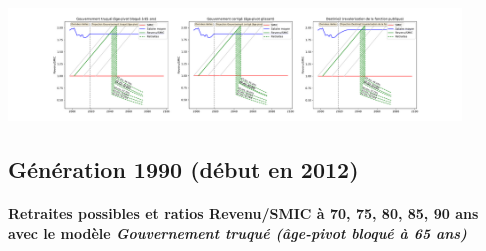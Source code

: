  \begin{center}\includegraphics[width=0.9\textwidth]{fig/Ascendant12_1980_22_dest_retraite.pdf}\end{center} \label{fig/Ascendant12_1980_22_dest_retraite.pdf} 

\newpage 
 
\subsection{Génération 1990 (début en 2012)} 

\paragraph{Retraites possibles et ratios Revenu/SMIC à 70, 75, 80, 85, 90 ans avec le modèle \emph{Gouvernement truqué (âge-pivot bloqué à 65 ans)}}  
 

